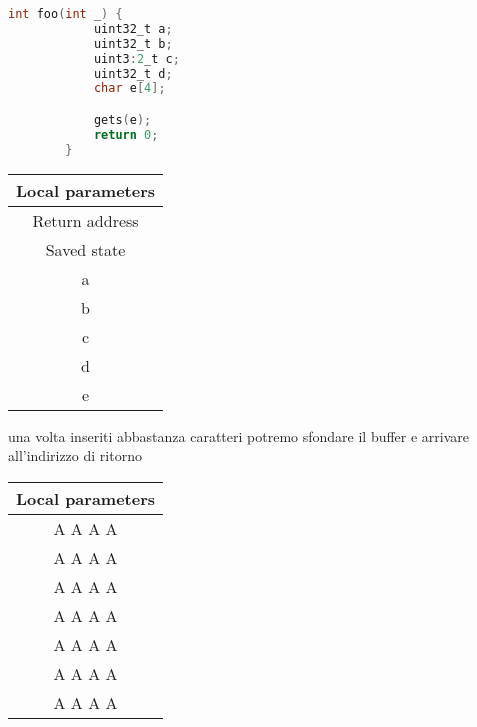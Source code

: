 \begin{ex}
    \begin{lstlisting}[language=C]
        int foo(int _) {
            uint32_t a;
            uint32_t b;
            uint3:2_t c;
            uint32_t d;
            char e[4];

            gets(e);
            return 0;
        }
    \end{lstlisting}

    \begin{center}
        \begin{table}[h!]
            \centering
            \begin{tabular}{|c|}
                \hline
                Local parameters \\
                \hline
                Return address \\
                \hline
                Saved state \\
                \hline
                a \\
                \hline
                b \\
                \hline
                c \\
                \hline
                d \\
                \hline
                e \\
                \hline
            \end{tabular}
        \end{table}
    \end{center}

    una volta inseriti abbastanza caratteri potremo sfondare il buffer e arrivare all'indirizzo di ritorno
    
    \begin{center}
        \begin{table}[h!]
            \centering
            \begin{tabular}{|c|}
                \hline
                Local parameters \\
                \hline
                A A A A \\
                \hline
                A A A A \\
                \hline
                A A A A \\
                \hline
                A A A A \\
                \hline
                A A A A \\
                \hline
                A A A A \\
                \hline
                A A A A \\
                \hline
            \end{tabular}
        \end{table}
    \end{center}


\end{ex}

